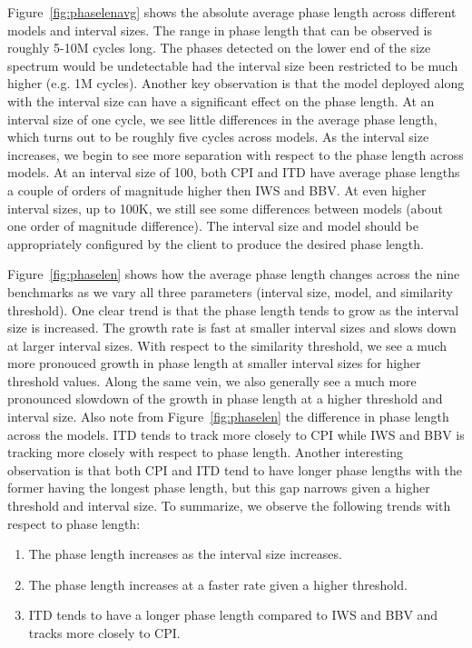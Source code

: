 Figure~\ref{fig:phaselenavg} shows the absolute average phase length across different models and interval sizes. The range in phase length that can be observed is roughly 5-10M cycles long. The phases detected on the lower end of the size spectrum would be undetectable had the interval size been restricted to be much higher (e.g. 1M cycles). Another key observation is that the model deployed along with the interval size can have a significant effect on the phase length.  At an interval size of one cycle, we see little differences in the average phase length, which turns out to be roughly five cycles across models. As the interval size increases, we begin to see more separation with respect to the phase length across models. At an interval size of 100, both CPI and ITD have average phase lengths a couple of orders of magnitude higher then IWS and BBV. At even higher interval sizes, up to 100K, we still see some differences between models (about one order of magnitude difference). The interval size and model should be appropriately configured by the client to produce the desired phase length.

Figure~\ref{fig:phaselen} shows how the average phase length changes across the nine benchmarks as we vary all three parameters (interval size, model, and similarity threshold). One clear trend is that the phase length tends to grow as the interval size is increased. The growth rate is fast at smaller interval sizes and slows down at larger interval sizes. With respect to the similarity threshold, we see a much more pronouced growth in phase length at smaller interval sizes for higher threshold values. Along the same vein, we also generally see a much more pronounced slowdown of the growth in phase length at a higher threshold and interval size. Also note from Figure~\ref{fig:phaselen} the difference in phase length across the models. ITD tends to track more closely to CPI while IWS and BBV is tracking more closely with respect to phase length. Another interesting observation is that both CPI and ITD tend to have longer phase lengths with the former having the longest phase length, but this gap narrows given a higher threshold and interval size. To summarize, we observe the following trends with respect to phase length:

\begin{enumerate}
\item The phase length increases as the interval size increases.
\item The phase length increases at a faster rate given a higher threshold.
\item ITD tends to have a longer phase length compared to IWS and BBV and tracks more closely to CPI.
\end{enumerate}

